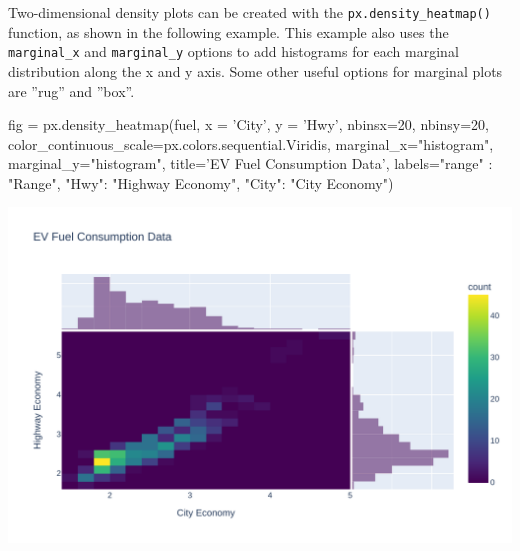 Two-dimensional density plots can be created with the \texttt{px.density\_heatmap()} function, as shown in the following example. This example also uses the \texttt{marginal\_x} and \texttt{marginal\_y} options to add histograms for each marginal distribution along the x and y axis. Some other useful options for marginal plots are ''rug'' and ''box''. 

\begin{samepage}
\begin{pythoncode}
fig = px.density_heatmap(fuel,
    x = 'City', y = 'Hwy',
    nbinsx=20, nbinsy=20,
    color_continuous_scale=px.colors.sequential.Viridis,
    marginal_x="histogram",
    marginal_y="histogram",
    title='EV Fuel Consumption Data',
    labels={"range" : "Range", 
           "Hwy": "Highway Economy", 
            "City": "City Economy"})
\end{pythoncode}
\end{samepage}

\begin{center}
  \includegraphics[width=.8\textwidth]{px.heatmap.pdf}
\end{center}


